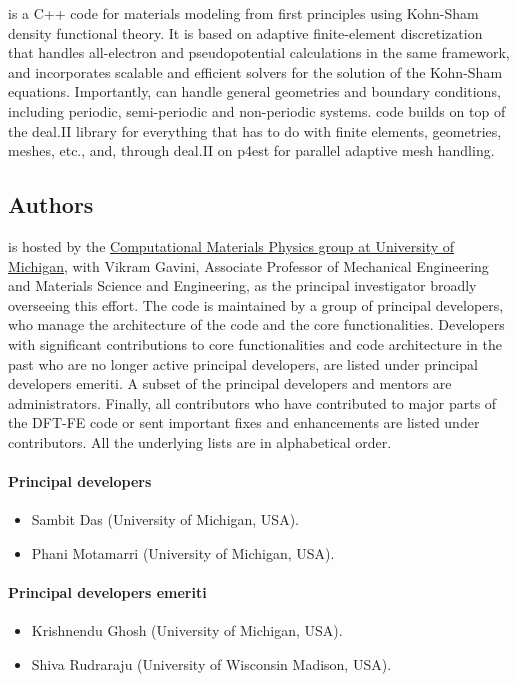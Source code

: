 \dftfe{} is a C++ code for materials modeling from first principles using Kohn-Sham density functional theory.
It is based on adaptive finite-element discretization that handles all-electron and pseudopotential calculations in the 
same framework, and incorporates scalable and efficient solvers for the solution of the Kohn-Sham equations. Importantly, \dftfe{} 
can handle general geometries and boundary conditions, including periodic, semi-periodic and non-periodic systems. \dftfe{} code 
builds on top of the deal.II library for everything that has to do with finite elements, geometries, meshes, etc., and, through 
deal.II on p4est for parallel adaptive mesh handling.

\subsection{Authors}
\label{sec:authors}
\dftfe{} is hosted by the \href{http://www-personal.umich.edu/~vikramg/}{Computational Materials Physics
group at University of Michigan}, with Vikram Gavini, Associate Professor of Mechanical Engineering and Materials Science and 
Engineering, as the principal investigator broadly overseeing this effort. The code is maintained by a group of principal developers, 
who manage the architecture of the code and the core functionalities. Developers with
significant contributions to core functionalities and code architecture in the past who are 
no longer active principal developers, are listed under principal developers emeriti. 
A subset of the principal developers and mentors are administrators. Finally, all contributors who have
contributed to major parts of the DFT-FE code or sent important fixes and enhancements are listed
under contributors. All the underlying lists are in alphabetical order. 

\paragraph{Principal developers}
\begin{itemize}
	\item Sambit Das (University of Michigan, USA).
	\item Phani Motamarri (University of Michigan, USA).
\end{itemize}

\paragraph{Principal developers emeriti}
\begin{itemize}
	\item Krishnendu Ghosh (University of Michigan, USA).
	\item Shiva Rudraraju (University of Wisconsin Madison, USA).	
\end{itemize}

